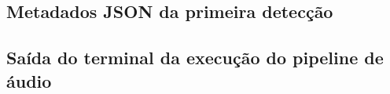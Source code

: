 \documentclass[12pt,a4paper]{article}
\begin{document}


\subsection{Metadados JSON da primeira detecção}\label{sec:metadados-deteccao}



\subsection{Saída do terminal da execução do pipeline de áudio}\label{sec:execucao-audio}


\end{document}
